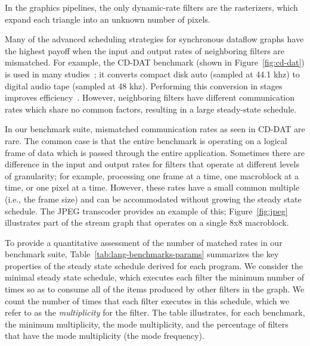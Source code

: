 In the graphics pipelines, the only dynamic-rate filters are the
rasterizers, which expand each triangle into an unknown number of
pixels.

  Many of
  the advanced scheduling strategies for synchronous dataflow graphs
  have the highest payoff when the input and output rates of
  neighboring filters are mismatched.  For example, the CD-DAT
  benchmark (shown in Figure~\ref{fig:cd-dat}) is used in many
  studies~\cite{murthy_minimizing_1994,bhattacharyya_optimal_1995,teich_3d_1999,bhattacharya_quasi-static_2000,chandrachoodan_efficient_2001,murthy_buffer_2004,ko_memory-constrained_2006};
  it converts compact disk auto (sampled at 44.1 khz) to digital audio
  tape (sampled at 48 khz).  Performing this conversion in stages
  improves efficiency~\cite{murthy_minimizing_1994}.  However,
  neighboring filters have different communication rates which share
  no common factors, resulting in a large steady-state schedule.

  In our benchmark suite, mismatched communication rates as seen in
  CD-DAT are rare.  The common case is that the entire benchmark is
  operating on a logical frame of data which is passed through the
  entire application.  Sometimes there are difference in the input and
  output rates for filters that operate at different levels of
  granularity; for example, processing one frame at a time, one
  macroblock at a time, or one pixel at a time.  However, these rates
  have a small common multiple (i.e., the frame size) and can be
  accommodated without growing the steady state schedule.  The JPEG
  transcoder provides an example of this; Figure~\ref{fig:jpeg}
  illustrates part of the stream graph that operates on a single 8x8
  macroblock.

  To provide a quantitative assessment of the number of matched rates
  in our benchmark suite, Table~\ref{tab:lang-benchmarks-params}
  summarizes the key properties of the steady state schedule derived
  for each program.  We consider the minimal steady state schedule,
  which executes each filter the minimum number of times so as to
  consume all of the items produced by other filters in the graph.  We
  count the number of times that each filter executes in this
  schedule, which we refer to as the {\it multiplicity} for the
  filter.  The table illustrates, for each benchmark, the minimum
  multiplicity, the mode multiplicity, and the percentage of filters
  that have the mode multiplicity (the mode frequency).

